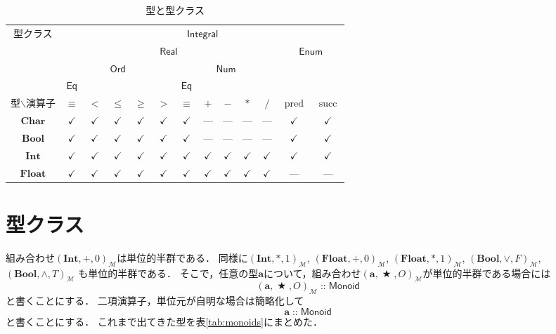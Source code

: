 \documentclass[twocolumn]{jsbook}
\newcommand{\hsklType}[1]{\textbf{#1}}
\newcommand{\hsklTypeclass}[1]{\mathsf{#1}}
\DeclareMathOperator{\hsklPred}{pred}
\DeclareMathOperator{\hsklSucc}{succ}
\newcommand{\hsklBool}{\hsklType{Bool}}
\newcommand{\hsklEnum}{\hsklTypeclass{Enum}}
\newcommand{\hsklInt}{\hsklType{Int}}
\newcommand{\hsklIntegral}{\hsklTypeclass{Integral}}
\newcommand{\hsklEq}{\hsklTypeclass{Eq}}
\newcommand{\hsklFloat}{\hsklType{Float}}
\newcommand{\hsklMonoid}{\hsklTypeclass{Monoid}}
\newcommand{\hsklNum}{\hsklTypeclass{Num}}
\newcommand{\hsklOrd}{\hsklTypeclass{Ord}}
\newcommand{\hsklReal}{\hsklTypeclass{Real}}
\DeclareMathOperator{\mathAnyBinaryOperator}{\bigstar}
\DeclareMathOperator{\mathIn}{::}
\newcommand{\mathMonoid}[3]{(#1,#2,#3)_\mathcal{M}}
\newcommand{\typename}[1]{\mathbf{#1}}
\newcommand{\typebool}{\typename{Bool}}
\newcommand{\typechar}{\typename{Char}}
\newcommand{\typeint}{\typename{Int}}
\newcommand{\typefloat}{\typename{Float}}
\begin{document}
\begin{table*}
\caption{型と型クラス}
\label{tab:type-and-typeclass}
\begin{center}
\begin{tabular}{||c||c|c|c|c|c|c|c|c|c|c|c|c||}
\hline
\multirow{4}{*}{型クラス}
    &\multicolumn{12}{|c||}{$\hsklIntegral$}\\
\cline{2-13}
\multirow{3}{*}{}
    &\multicolumn{10}{|c|}{$\hsklReal$}
    &\multicolumn{2}{|c||}{$\hsklEnum$}\\
\cline{2-11}
\multirow{2}{*}{}
    &\multicolumn{5}{|c|}{$\hsklOrd$}
    &\multicolumn{5}{|c|}{$\hsklNum$}
    &\multicolumn{2}{|c||}{ }\\
\cline{2-2}\cline{7-7}
{ }
    &$\hsklEq$
    &\multicolumn{4}{|c|}{ }
    &$\hsklEq$
    &\multicolumn{4}{|c|}{ }
    &\multicolumn{2}{|c||}{ }\\
\hline\hline
型$\backslash$演算子
    &$\equiv$
    &$<$
    &$\le$
    &$\ge$
    &$>$
    &$\equiv$
    &$+$
    &$-$
    &$*$
    &$/$
    &$\hsklPred$
    &$\hsklSucc$\\
\hline
$\typechar$
    &$\checkmark$
    &$\checkmark$
    &$\checkmark$
    &$\checkmark$
    &$\checkmark$
    &$\checkmark$
    &---
    &---
    &---
    &---
    &$\checkmark$
    &$\checkmark$\\
\hline
$\typebool$
    &$\checkmark$
    &$\checkmark$
    &$\checkmark$
    &$\checkmark$
    &$\checkmark$
    &$\checkmark$
    &---
    &---
    &---
    &---
    &$\checkmark$
    &$\checkmark$\\
\hline
$\typeint$
    &$\checkmark$
    &$\checkmark$
    &$\checkmark$
    &$\checkmark$
    &$\checkmark$
    &$\checkmark$
    &$\checkmark$
    &$\checkmark$
    &$\checkmark$
    &$\checkmark$
    &$\checkmark$
    &$\checkmark$\\
\hline
$\typefloat$
    &$\checkmark$
    &$\checkmark$
    &$\checkmark$
    &$\checkmark$
    &$\checkmark$
    &$\checkmark$
    &$\checkmark$
    &$\checkmark$
    &$\checkmark$
    &$\checkmark$
    &---
    &---\\
\hline
\end{tabular}
\end{center}
\end{table*}

\section{型クラス}

組み合わせ$\mathMonoid{\hsklInt}{+}{0}$は単位的半群である．
同様に$\mathMonoid{\hsklInt}{*}{1}$, $\mathMonoid{\hsklFloat}{+}{0}$, $\mathMonoid{\hsklFloat}{*}{1}$, $\mathMonoid{\hsklBool}{\vee}{F}$, $\mathMonoid{\hsklBool}{\wedge}{T}$ も単位的半群である．
そこで，任意の型$\hsklType{a}$について，組み合わせ$\mathMonoid{\hsklType{a}}{\mathAnyBinaryOperator}{O}$が単位的半群である場合には$$\mathMonoid{\hsklType{a}}{\mathAnyBinaryOperator}{O}\mathIn\hsklMonoid$$と書くことにする．
二項演算子，単位元が自明な場合は簡略化して$$\hsklType{a}\mathIn\hsklMonoid$$と書くことにする．
これまで出てきた型を表\ref{tab:monoids}にまとめた．
\end{document}
